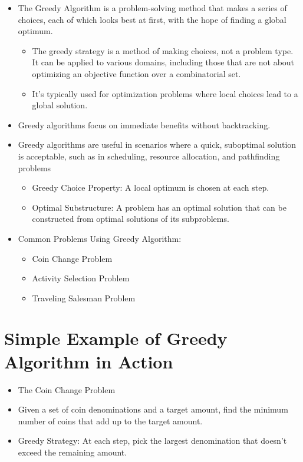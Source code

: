 \documentclass[
  letterpaper,
  DIV=11,
  numbers=noendperiod]{scrreprt}
\providecommand{\tightlist}{%
  \setlength{\itemsep}{0pt}\setlength{\parskip}{0pt}}\usepackage{longtable,booktabs,array}
\begin{document}
\begin{itemize}
\tightlist
\item
  The Greedy Algorithm is a problem-solving method that makes a series
  of choices, each of which looks best at first, with the hope of
  finding a global optimum.

  \begin{itemize}
  \tightlist
  \item
    The greedy strategy is a method of making choices, not a problem
    type. It can be applied to various domains, including those that are
    not about optimizing an objective function over a combinatorial set.
  \item
    It's typically used for optimization problems where local choices
    lead to a global solution.
  \end{itemize}
\item
  Greedy algorithms focus on immediate benefits without backtracking.
\item
  Greedy algorithms are useful in scenarios where a quick, suboptimal
  solution is acceptable, such as in scheduling, resource allocation,
  and pathfinding problems

  \begin{itemize}
  \tightlist
  \item
    Greedy Choice Property: A local optimum is chosen at each step.
  \item
    Optimal Substructure: A problem has an optimal solution that can be
    constructed from optimal solutions of its subproblems.
  \end{itemize}
\item
  Common Problems Using Greedy Algorithm:

  \begin{itemize}
  \tightlist
  \item
    Coin Change Problem
  \item
    Activity Selection Problem
  \item
    Traveling Salesman Problem
  \end{itemize}
\end{itemize}

\section{Simple Example of Greedy Algorithm in
Action}\label{simple-example-of-greedy-algorithm-in-action}

\begin{itemize}
\tightlist
\item
  The Coin Change Problem
\item
  Given a set of coin denominations and a target amount, find the
  minimum number of coins that add up to the target amount.
\item
  Greedy Strategy: At each step, pick the largest denomination that
  doesn't exceed the remaining amount.
\end{itemize}
\end{document}

